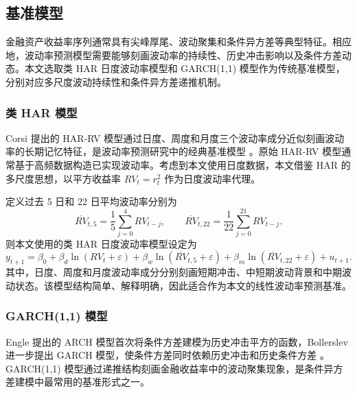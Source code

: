 \subsection{基准模型}

金融资产收益率序列通常具有尖峰厚尾、波动聚集和条件异方差等典型特征。相应地，波动率预测模型需要能够刻画波动率的持续性、历史冲击影响以及条件方差动态。本文选取类 HAR 日度波动率模型和 GARCH(1,1) 模型作为传统基准模型，分别对应多尺度波动持续性和条件异方差递推机制。

\subsubsection{类 HAR 模型}

Corsi 提出的 HAR-RV 模型通过日度、周度和月度三个波动率成分近似刻画波动率的长期记忆特征，是波动率预测研究中的经典基准模型 \citep{Corsi2009}。原始 HAR-RV 模型通常基于高频数据构造已实现波动率。考虑到本文使用日度数据，本文借鉴 HAR 的多尺度思想，以平方收益率 \(RV_t=r_t^2\) 作为日度波动率代理。

定义过去 5 日和 22 日平均波动率分别为
\begin{equation}
	\overline{RV}_{t,5}
	=
	\frac{1}{5}\sum_{j=0}^{4}RV_{t-j},
	\qquad
	\overline{RV}_{t,22}
	=
	\frac{1}{22}\sum_{j=0}^{21}RV_{t-j}.
\end{equation}
则本文使用的类 HAR 日度波动率模型设定为
\begin{equation}
	y_{t+1}
	=
	\beta_0
	+
	\beta_d \ln(RV_t+\varepsilon)
	+
	\beta_w \ln(\overline{RV}_{t,5}+\varepsilon)
	+
	\beta_m \ln(\overline{RV}_{t,22}+\varepsilon)
	+
	u_{t+1}.
\end{equation}
其中，日度、周度和月度波动率成分分别刻画短期冲击、中短期波动背景和中期波动状态。该模型结构简单、解释明确，因此适合作为本文的线性波动率预测基准。

\subsubsection{GARCH(1,1) 模型}

Engle 提出的 ARCH 模型首次将条件方差建模为历史冲击平方的函数，Bollerslev 进一步提出 GARCH 模型，使条件方差同时依赖历史冲击和历史条件方差 \citep{Engle1982,Bollerslev1986}。GARCH(1,1) 模型通过递推结构刻画金融收益率中的波动聚集现象，是条件异方差建模中最常用的基准形式之一。

